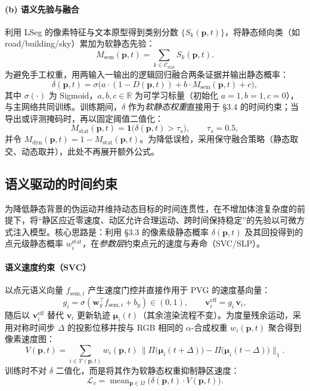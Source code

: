 \documentclass[10pt,conference]{IEEEtran} %
\begin{document}
\paragraph{(b) 语义先验与融合}
利用 LSeg 的像素特征与文本原型得到类别分数 $\{S_k(\mathbf p,t)\}$，将静态倾向类（如 road/building/sky）累加为软静态先验：
\begin{equation}
M_{\mathrm{sem}}(\mathbf p,t)=\sum_{k\in\mathcal C_{\mathrm{stat}}}S_k(\mathbf p,t).
\label{eq:demm_sem}
\end{equation}
为避免手工权重，用两输入一输出的逻辑回归融合两条证据并输出静态概率：
\begin{equation}
\delta(\mathbf p,t)=\sigma\!\big(a\cdot(1-D(\mathbf p,t))+b\cdot M_{\mathrm{sem}}(\mathbf p,t)+c\big),
\label{eq:demm_delta_final}
\end{equation}
其中 $\sigma(\cdot)$ 为 Sigmoid，$a,b,c\in\mathbb{R}$ 为可学习标量（初始化 $a{=}1,b{=}1,c{=}0$），与主网络共同训练。训练期间，$\delta$ 作为\emph{软静态权重}直接用于 §3.4 的时间约束；当导出或评测掩码时，再以固定阈值二值化：
\begin{equation}
M_{\mathrm{stat}}(\mathbf p,t)=\mathbf{1}\!\big(\delta(\mathbf p,t)>\tau_s\big),\qquad \tau_s=0.5,
\end{equation}
并令 $M_{\mathrm{dyn}}(\mathbf p,t)=1-M_{\mathrm{stat}}(\mathbf p,t)$。为降低误检，采用保守融合策略（静态取交、动态取并），此处不再展开额外公式。

\subsection{语义驱动的时间约束}
为降低静态背景的伪运动并维持动态目标的时间连贯性，在不增加体渲复杂度的前提下，将“静区应近零速度、动区允许合理运动、跨时间保持稳定”的先验以可微方式注入模型。核心思路是：利用 §3.3 的像素级静态概率 $\delta(\mathbf p,t)$ 及其回投得到的点元级静态概率 $w_i^{\mathrm{stat}}$，在\emph{参数层}约束点元的速度与寿命（SVC/SLP）。

\paragraph{语义速度约束（SVC）}
以点元语义向量 $f_{\mathrm{sem},i}$ 产生速度门控并直接作用于 PVG 的速度基向量：
\begin{equation}
g_i=\sigma(\mathbf w_g^\top f_{\mathrm{sem},i}+b_g)\in(0,1),\qquad
\bm{v}_i^{\mathrm{eff}}=g_i\,\bm{v}_i,
\label{eq:svc_gate}
\end{equation}
随后以 $\bm{v}_i^{\mathrm{eff}}$ 替代 $\bm{v}_i$ 更新轨迹 $\bm{\mu}_i(t)$（其余渲染流程不变）。为度量残余运动，采用对称时间步 $\Delta$ 的投影位移并按与 RGB 相同的 $\alpha$-合成权重 $w_i(\mathbf p,t)$ 聚合得到像素速度图：
\begin{equation}
V(\mathbf p,t)=\sum_{i\in\mathcal V(\mathbf p,t)} w_i(\mathbf p,t)\,
\big\|\Pi\!\big(\bm{\mu}_i(t+\Delta)\big)-\Pi\!\big(\bm{\mu}_i(t-\Delta)\big)\big\|_1 .
\label{eq:vel_map}
\end{equation}
训练时不对 $\delta$ 二值化，而是将其作为软静态权重抑制静区速度：
\begin{equation}
\mathcal L_{v}=\operatorname{mean}_{\mathbf p\in\Omega}\!\big(\delta(\mathbf p,t)\cdot V(\mathbf p,t)\big).
\label{eq:svc_loss}
\end{equation}
\end{document}
